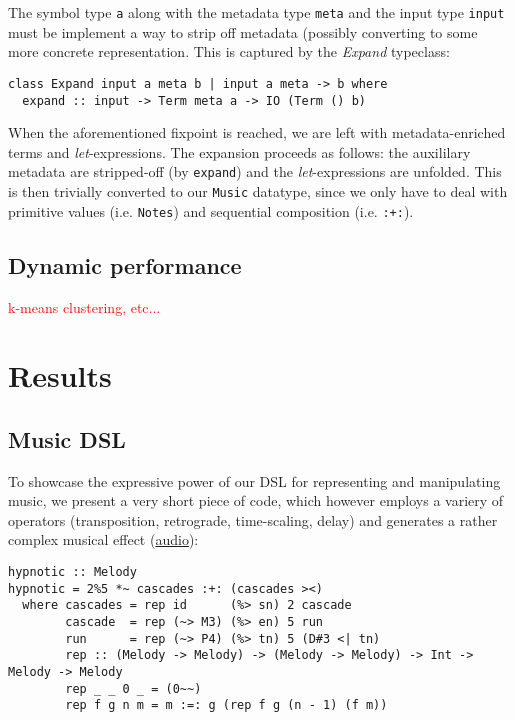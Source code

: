 \documentclass[11pt,a4paper]{article}
\newcommand{\icode}[1]{\texttt{#1}}
\newcommand\todo[1]{\textcolor{red}{#1}}
\begin{document}
The symbol type \icode{a} along with the metadata type \icode{meta} and the input type \icode{input} must be implement a way to strip off metadata (possibly converting to some more concrete representation. This is captured by the \textit{Expand} typeclass:
\begin{center}\begin{minipage}{0.6\textwidth}\begin{verbatim}
class Expand input a meta b | input a meta -> b where
  expand :: input -> Term meta a -> IO (Term () b)
\end{verbatim}
\end{minipage}
\end{center}

When the aforementioned fixpoint is reached, we are left with metadata-enriched terms and \textit{let}-expressions. The expansion proceeds as follows: the auxililary metadata are stripped-off (by \icode{expand}) and the \textit{let}-expressions are unfolded. This is then trivially converted to our \icode{Music} datatype, since we only have to deal with primitive values (i.e. \icode{Notes}) and sequential composition (i.e. \icode{:+:}).

\subsection{Dynamic performance}
\todo{k-means clustering, etc...}


\section{Results}
\subsection{Music DSL}
To showcase the expressive power of our DSL for representing and manipulating music, we present a very short piece of code, which however employs a variery of operators (transposition, retrograde, time-scaling, delay) and generates a rather complex musical effect (\href{https://soundcloud.com/algo-rhythm-haskell/hypnotic}{audio}):
\begin{verbatim}
hypnotic :: Melody
hypnotic = 2%5 *~ cascades :+: (cascades ><)
  where cascades = rep id      (%> sn) 2 cascade
        cascade  = rep (~> M3) (%> en) 5 run
        run      = rep (~> P4) (%> tn) 5 (D#3 <| tn)
        rep :: (Melody -> Melody) -> (Melody -> Melody) -> Int -> Melody -> Melody
        rep _ _ 0 _ = (0~~)
        rep f g n m = m :=: g (rep f g (n - 1) (f m))
\end{verbatim}
\end{document}
